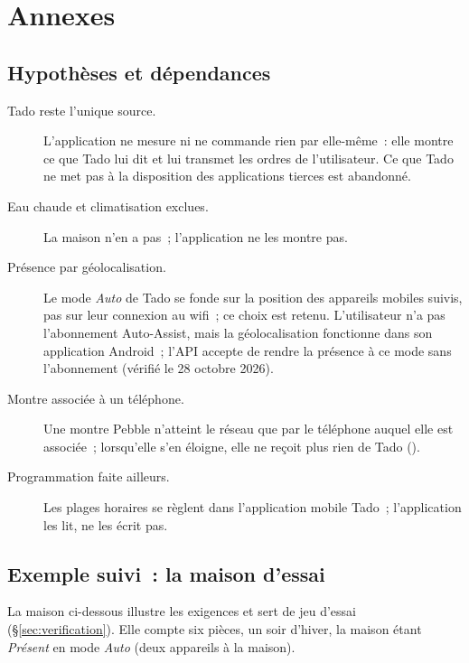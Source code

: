 \section{Annexes}

\subsection{Hypothèses et dépendances}
\label{sec:hypotheses}

\begin{description}
  \item[Tado reste l'unique source.] L'application ne mesure ni ne commande rien par
    elle-même~: elle montre ce que Tado lui dit et lui transmet les ordres de l'utilisateur.
    Ce que Tado ne met pas à la disposition des applications tierces est abandonné.
  \item[Eau chaude et climatisation exclues.] La maison n'en a pas~; l'application ne les
    montre pas.
  \item[Présence par géolocalisation.] Le mode \emph{Auto} de Tado se fonde sur la position
    des appareils mobiles suivis, pas sur leur connexion au wifi~; ce choix est retenu. L'utilisateur n'a pas l'abonnement
    Auto-Assist, mais la géolocalisation fonctionne dans son application Android~; l'API
    accepte de rendre la présence à ce mode sans l'abonnement (vérifié le 28 octobre 2026).
  \item[Montre associée à un téléphone.] Une montre Pebble n'atteint le réseau que par le
    téléphone auquel elle est associée~; lorsqu'elle s'en éloigne, elle ne reçoit plus rien
    de Tado ().
  \item[Programmation faite ailleurs.] Les plages horaires se règlent dans l'application
    mobile Tado~; l'application les lit, ne les écrit pas.
\end{description}

\subsection{Exemple suivi~: la maison d'essai}
\label{sec:maison-essai}

La maison ci-dessous illustre les exigences et sert de jeu d'essai
(§\ref{sec:verification}). Elle compte six pièces, un soir d'hiver, la maison étant
\emph{Présent} en mode \emph{Auto} (deux appareils à la maison).

